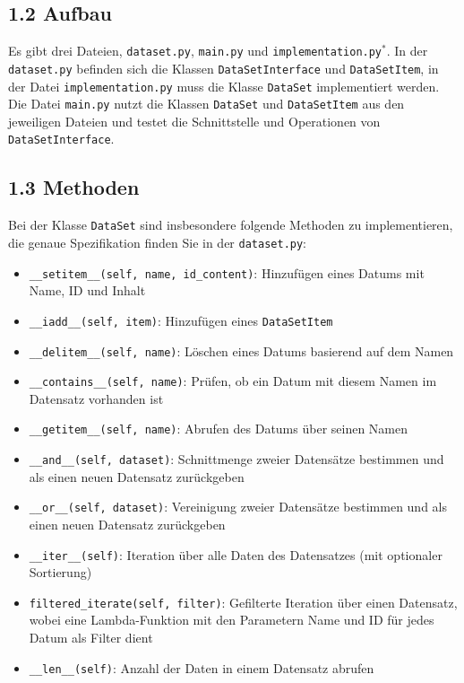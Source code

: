 \documentclass[]{article}
\begin{document}
\subsection*{1.2 Aufbau}
Es gibt drei Dateien, \texttt{dataset.py}, \texttt{main.py} und \texttt{implementation.py}$^{*}$. In der \texttt{dataset.py} befinden sich die Klassen \texttt{DataSetInterface} und \texttt{DataSetItem}, in der Datei \texttt{implementation.py} muss die Klasse \texttt{DataSet} implementiert werden. Die Datei \texttt{main.py} nutzt die Klassen \texttt{DataSet} und \texttt{DataSetItem} aus den jeweiligen Dateien und testet die Schnittstelle und Operationen von \texttt{DataSetInterface}.\\


\subsection*{1.3 Methoden}
Bei der Klasse \texttt{DataSet} sind insbesondere folgende Methoden zu implementieren, die genaue Spezifikation finden Sie in der \texttt{dataset.py}:
\begin{itemize}
    \item \texttt{\_\_setitem\_\_(self, name, id\_content)}: Hinzufügen eines Datums mit Name, ID und Inhalt
    \item \texttt{\_\_iadd\_\_(self, item)}: Hinzufügen eines \texttt{DataSetItem}
    \item \texttt{\_\_delitem\_\_(self, name)}: Löschen eines Datums basierend auf dem Namen
    \item \texttt{\_\_contains\_\_(self, name)}: Prüfen, ob ein Datum mit diesem Namen im Datensatz vorhanden ist
    \item \texttt{\_\_getitem\_\_(self, name)}: Abrufen des Datums über seinen Namen
    \item \texttt{\_\_and\_\_(self, dataset)}: Schnittmenge zweier Datensätze bestimmen und als einen neuen Datensatz zurückgeben
    \item \texttt{\_\_or\_\_(self, dataset)}: Vereinigung zweier Datensätze bestimmen und als einen neuen Datensatz zurückgeben
    \item \texttt{\_\_iter\_\_(self)}: Iteration über alle Daten des Datensatzes (mit optionaler Sortierung)
    \item \texttt{filtered\_iterate(self, filter)}: Gefilterte Iteration über einen Datensatz, wobei eine Lambda-Funktion mit den Parametern Name und ID für jedes Datum als Filter dient
    \item \texttt{\_\_len\_\_(self)}: Anzahl der Daten in einem Datensatz abrufen
\end{itemize}
\end{document}
